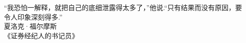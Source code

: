\begin{flushright}
“我恐怕一解释，就把自己的底细泄露得太多了，”他说.“只有结果而没有原因，要令人印象深刻得多.”\\
夏洛克·福尔摩斯\\《证券经纪人的书记员》
\end{flushright}

